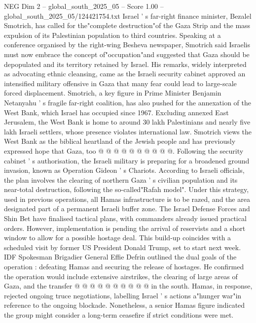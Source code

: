 \begin{textsample}{NEG Dim 2 – global\_south\_2025\_05 – Score 1.00 – global\_south\_2025\_05/124421754.txt}  \label{ex:f2_neg_150}
Israel ' s far-right finance minister, Bezalel Smotrich, has called for the"complete destruction"of the Gaza Strip and the mass expulsion of its Palestinian population to third countries.
Speaking at a conference organised by the right-wing Besheva newspaper, Smotrich said Israelis must now embrace the concept of"occupation"and suggested that Gaza should be depopulated and its territory retained by Israel.
His remarks, widely interpreted as advocating ethnic cleansing, came as the Israeli security cabinet approved an intensified military offensive in Gaza that many fear could lead to large-scale forced displacement.
Smotrich, a key figure in Prime Minister Benjamin Netanyahu ' s fragile far-right coalition, has also pushed for the annexation of the West Bank, which Israel has occupied since 1967.
Excluding annexed East Jerusalem, the West Bank is home to around 30 lakh Palestinians and nearly five lakh Israeli settlers, whose presence violates international law.
Smotrich views the West Bank as the biblical heartland of the Jewish people and has previously expressed hope that Gaza, too @ @ @ @ @ @ @ @ @ @.
Following the security cabinet ' s authorisation, the Israeli military is preparing for a broadened ground invasion, known as Operation Gideon ' s Chariots.
According to Israeli officials, the plan involves the clearing of northern Gaza ' s civilian population and its near-total destruction, following the so-called"Rafah model".
Under this strategy, used in previous operations, all Hamas infrastructure is to be razed, and the area designated part of a permanent Israeli buffer zone.
The Israel Defense Forces and Shin Bet have finalised tactical plans, with commanders already issued practical orders.
However, implementation is pending the arrival of reservists and a short window to allow for a possible hostage deal.
This build-up coincides with a scheduled visit by former US President Donald Trump, set to start next week.
IDF Spokesman Brigadier General Effie Defrin outlined the dual goals of the operation : defeating Hamas and securing the release of hostages.
He confirmed the operation would include extensive airstrikes, the clearing of large areas of Gaza, and the transfer @ @ @ @ @ @ @ @ @ @ in the south.
Hamas, in response, rejected ongoing truce negotiations, labelling Israel ' s actions a"hunger war"in reference to the ongoing blockade.
Nonetheless, a senior Hamas figure indicated the group might consider a long-term ceasefire if strict conditions were met.

\end{textsample}
